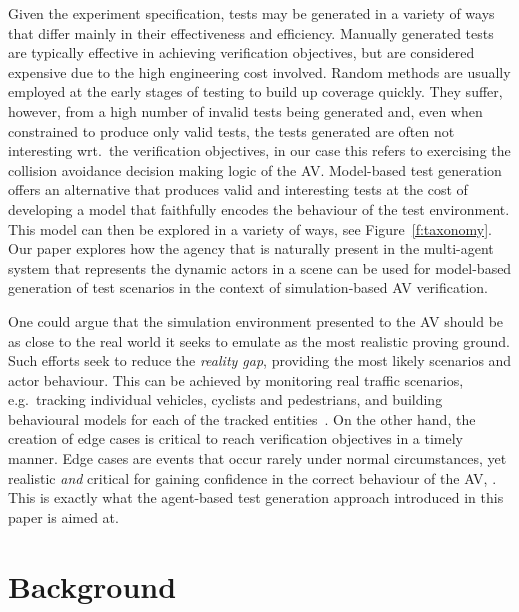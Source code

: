 \documentclass[letterpaper, 10 pt, journal, twoside]{IEEEtran}
\begin{document}
%
Given the experiment specification, tests may be generated in a variety of ways that differ mainly in their effectiveness and efficiency. 
%
Manually generated tests are typically effective in achieving verification objectives, but are considered expensive due to the high engineering cost involved. 
%
Random methods are usually employed at the early stages of testing to build up coverage quickly. They suffer, however, from a high number of invalid tests being generated and, even when constrained to produce only valid tests, the tests generated are often not interesting wrt.\ the verification objectives, in our case this refers to exercising the collision avoidance decision making logic of the AV. 
%
Model-based test generation offers an alternative that produces valid and interesting tests at the cost of developing a model that faithfully encodes the behaviour of the test environment. This model can then be explored in a variety of ways, see Figure~\ref{f:taxonomy}.
%
Our paper explores how the agency that is naturally present in the multi-agent system that represents the dynamic actors in a scene can be used for model-based generation of test scenarios in the context of simulation-based AV verification. 

One could argue that the simulation environment presented to the AV should be as close to the real world it seeks to emulate as the most realistic proving ground. Such efforts seek to reduce the \textit{reality gap}, %
providing the most likely scenarios and actor behaviour. This can be achieved by monitoring real traffic scenarios, e.g.\ tracking individual vehicles, cyclists and pedestrians, and building behavioural models for each of the tracked entities~\cite{behbahani2019learning}.
%
On the other hand, the creation of edge cases is critical to reach verification objectives in a timely manner. Edge cases are events that occur rarely under normal circumstances, yet realistic \textit{and\/} critical for gaining confidence in the correct behaviour of the AV, .
%
This is exactly what the agent-based test generation approach introduced in this paper is aimed at.  


\section{Background}\label{s:background}
\end{document}
